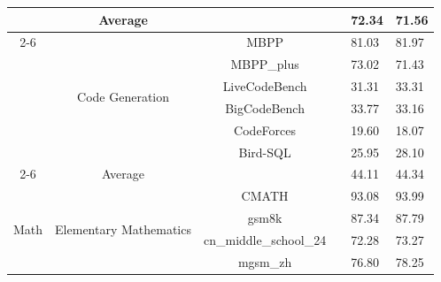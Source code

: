 \begin{table}[h]
\begin{tabular}{ccccll}
                                     & {Average}                                                                                &                     &  & 72.34 & 71.56 \\ \cmidrule{2-6} 
                                     & \multirow{6}{*}{{Code Generation}}                                                      & MBPP                &  & 81.03 & 81.97 \\ 
                                     &                                                                                                 & MBPP\_plus          &  & 73.02 & 71.43 \\
                                     &                                                                                                 & LiveCodeBench       &  & 31.31 & 33.31 \\
                                     &                                                                                                 & BigCodeBench        &  & 33.77 & 33.16 \\
                                     &                                                                                                 & CodeForces          &  & 19.60  & 18.07 \\
                                     &                                                                                                 & Bird-SQL            &  & 25.95 & 28.10  \\ \cmidrule{2-6} 
                                     & {Average}                                                                                &                     &  & 44.11 & 44.34  \\ \midrule
\multirow{18}{*}{{Math}}      & \multirow{5}{*}{{Elementary Mathematics}}                                                & CMATH               &  & 93.08 & 93.99 \\
                                     &                                                                                                 & gsm8k               &  & 87.34 & 87.79 \\
                                     &                                                                                                 & cn\_middle\_school\_24 &  & 72.28 & 73.27 \\
                                     &                                                                                                 & mgsm\_zh            &  & 76.80  & 78.25 \\

\end{tabular}
\end{table}
